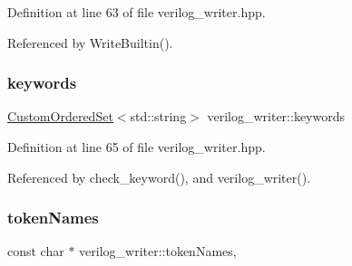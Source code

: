 Definition at line 63 of file verilog\+\_\+writer.\+hpp.



Referenced by Write\+Builtin().

\mbox{\label{classverilog__writer_a9f92a193bda2a4e3541592da303b112e}} 
\subsubsection{\texorpdfstring{keywords}{keywords}}
{\footnotesize\ttfamily \hyperlink{classCustomOrderedSet}{Custom\+Ordered\+Set}$<$std\+::string$>$ verilog\+\_\+writer\+::keywords\hspace{0.3cm}{\ttfamily [protected]}}



Definition at line 65 of file verilog\+\_\+writer.\+hpp.



Referenced by check\+\_\+keyword(), and verilog\+\_\+writer().

\mbox{\label{classverilog__writer_adbbb8a6e0f6c3c951c7a31741275a1c3}} 
\subsubsection{\texorpdfstring{token\+Names}{tokenNames}}
{\footnotesize\ttfamily const char $\ast$ verilog\+\_\+writer\+::token\+Names\hspace{0.3cm}{\ttfamily [static]}, {\ttfamily [protected]}}

